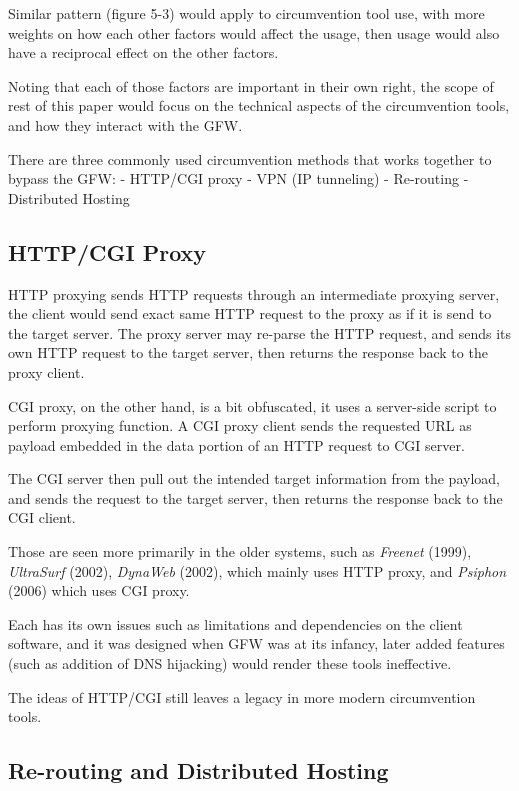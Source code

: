 \documentclass[nonacm,sigplan,screen]{acmart}
\begin{document}
Similar pattern (figure 5-3) \cite{47_circumvention} would apply to
circumvention tool use, with more weights on how each other factors
would affect the usage, then usage would also have a reciprocal effect
on the other factors.

Noting that each of those factors are important in their own right, the
scope of rest of this paper would focus on the technical aspects of the
circumvention tools, and how they interact with the GFW.

There are three commonly used circumvention methods that works together
to bypass the GFW: \cite{07_taxonomy} - HTTP/CGI proxy - VPN (IP
tunneling) - Re-routing - Distributed Hosting

\hypertarget{httpcgi-proxy}{%
\subsection{HTTP/CGI Proxy}\label{httpcgi-proxy}}

HTTP proxying sends HTTP requests through an intermediate proxying
server, the client would send exact same HTTP request to the proxy as if
it is send to the target server. The proxy server may re-parse the HTTP
request, and sends its own HTTP request to the target server, then
returns the response back to the proxy client.

CGI proxy, on the other hand, is a bit obfuscated, it uses a server-side
script to perform proxying function. A CGI proxy client sends the
requested URL as payload embedded in the data portion of an HTTP request
to CGI server.

The CGI server then pull out the intended target information from the
payload, and sends the request to the target server, then returns the
response back to the CGI client.

Those are seen more primarily in the older systems, such as
\emph{Freenet} (1999), \emph{UltraSurf} (2002), \emph{DynaWeb} (2002),
which mainly uses HTTP proxy, and \emph{Psiphon} (2006) which uses CGI
proxy.

Each has its own issues such as limitations and dependencies on the
client software, and it was designed when GFW was at its infancy, later
added features (such as addition of DNS hijacking) would render these
tools ineffective.

The ideas of HTTP/CGI still leaves a legacy in more modern circumvention
tools.

\hypertarget{re-routing-and-distributed-hosting}{%
\subsection{Re-routing and Distributed
Hosting}\label{re-routing-and-distributed-hosting}}
\end{document}
